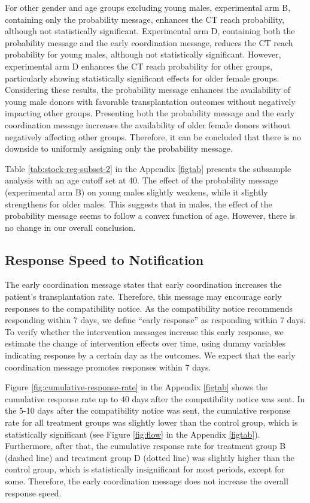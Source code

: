 \documentclass[12pt, a4paper]{article}
\begin{document}
For other gender and age groups excluding young males, experimental arm B, containing only the probability message, enhances the CT reach probability, although not statistically significant. Experimental arm D, containing both the probability message and the early coordination message, reduces the CT reach probability for young males, although not statistically significant. However, experimental arm D enhances the CT reach probability for other groups, particularly showing statistically significant effects for older female groups. Considering these results, the probability message enhances the availability of young male donors with favorable transplantation outcomes without negatively impacting other groups. Presenting both the probability message and the early coordination message increases the availability of older female donors without negatively affecting other groups. Therefore, it can be concluded that there is no downside to uniformly assigning only the probability message.

Table \ref{tab:stock-reg-subset-2} in the Appendix \ref{figtab} presents the subsample analysis with an age cutoff set at 40. The effect of the probability message (experimental arm B) on young males slightly weakens, while it slightly strengthens for older males. This suggests that in males, the effect of the probability message seems to follow a convex function of age. However, there is no change in our overall conclusion.

\hypertarget{reply-speed}{%
\subsection{Response Speed to Notification}\label{reply-speed}}

The early coordination message states that early coordination increases the patient's transplantation rate. Therefore, this message may encourage early responses to the compatibility notice. As the compatibility notice recommends responding within 7 days, we define ``early response'' as responding within 7 days. To verify whether the intervention messages increase this early response, we estimate the change of intervention effects over time, using dummy variables indicating response by a certain day as the outcomes. We expect that the early coordination message promotes responses within 7 days.

Figure \ref{fig:cumulative-response-rate} in the Appendix \ref{figtab} shows the cumulative response rate up to 40 days after the compatibility notice was sent. In the 5-10 days after the compatibility notice was sent, the cumulative response rate for all treatment groups was slightly lower than the control group, which is statistically significant (see Figure \ref{fig:flow} in the Appendix \ref{figtab}). Furthermore, after that, the cumulative response rate for treatment group B (dashed line) and treatment group D (dotted line) was slightly higher than the control group, which is statistically insignificant for most periods, except for some. Therefore, the early coordination message does not increase the overall response speed.
\end{document}
